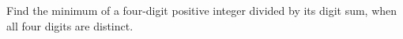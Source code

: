 Find the minimum of a four-digit positive integer divided by its digit sum, when all four digits are distinct.
